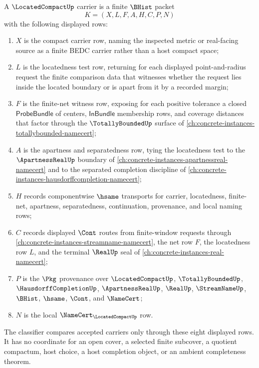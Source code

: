 \begin{definition}
\label{def:located-compact-carrier}
A $\LocatedCompactUp$ carrier is a finite $\BHist$ packet
$$
K=(X,L,F,A,H,C,P,N)
$$
with the following displayed rows:
\begin{enumerate}
\item $X$ is the compact carrier row, naming the inspected metric or real-facing source as a finite BEDC carrier rather than a host compact space;
\item $L$ is the locatedness test row, returning for each displayed point-and-radius request the finite comparison data that witnesses whether the request lies inside the located boundary or is apart from it by a recorded margin;
\item $F$ is the finite-net witness row, exposing for each positive tolerance a closed $\mathsf{ProbeBundle}$ of centers, $\mathsf{InBundle}$ membership rows, and coverage distances that factor through the $\TotallyBoundedUp$ surface of \autoref{ch:concrete-instances-totallybounded-namecert};
\item $A$ is the apartness and separatedness row, tying the locatedness test to the $\ApartnessRealUp$ boundary of \autoref{ch:concrete-instances-apartnessreal-namecert} and to the separated completion discipline of \autoref{ch:concrete-instances-hausdorffcompletion-namecert};
\item $H$ records componentwise $\hsame$ transports for carrier, locatedness, finite-net, apartness, separatedness, continuation, provenance, and local naming rows;
\item $C$ records displayed $\Cont$ routes from finite-window requests through \autoref{ch:concrete-instances-streamname-namecert}, the net row $F$, the locatedness row $L$, and the terminal $\RealUp$ seal of \autoref{ch:concrete-instances-real-namecert};
\item $P$ is the $\Pkg$ provenance over $\LocatedCompactUp$, $\TotallyBoundedUp$, $\HausdorffCompletionUp$, $\ApartnessRealUp$, $\RealUp$, $\StreamNameUp$, $\BHist$, $\hsame$, $\Cont$, and $\NameCert$;
\item $N$ is the local $\NameCert_{\LocatedCompactUp}$ row.
\end{enumerate}
The classifier compares accepted carriers only through these eight displayed rows. It has no coordinate for an open cover, a selected finite subcover, a quotient compactum, host choice, a host completion object, or an ambient completeness theorem.
\end{definition}

